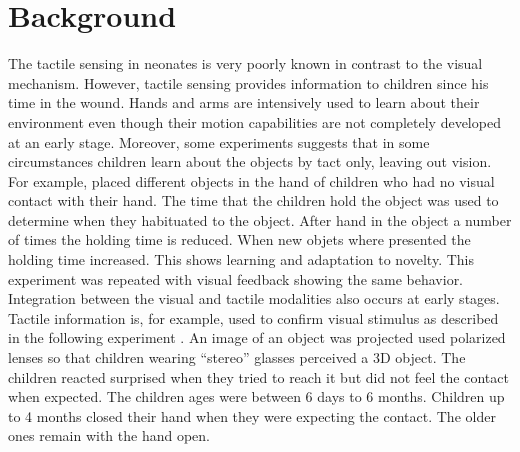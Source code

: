 \section{Background}
\label{sec:background}

The tactile sensing in neonates is very poorly known
 in contrast to the visual mechanism\cite{Streti-voir-atteindre-toucher}.
However, tactile sensing provides information to children since
his time in the wound. Hands and arms are intensively used to
learn about their environment even though their motion
capabilities are not completely developed at an early stage.
Moreover, some experiments suggests that in some circumstances
children learn about the objects by tact only, leaving out vision.
For example, \cite{StretiHabituation} placed different objects in
the hand of children who had no visual contact with their hand.
The time that the children hold the object was used to determine
when they habituated to the object. After hand in the object a
number of times the holding time is reduced. When new objets where
presented the holding time increased. This shows learning and
adaptation to novelty. This experiment was repeated with visual
feedback showing the same behavior.
Integration between the visual and tactile modalities also occurs
at early stages. Tactile information is, for example, used to
confirm visual stimulus as described in the following experiment
\cite{tactileconfirmation}. An image of an object was projected
used polarized lenses so that children wearing ``stereo'' glasses
perceived a 3D object. The children reacted surprised when they
tried to reach it but did not feel the contact when expected. The
children ages were between 6 days to 6 months. Children up to 4
months closed their hand when they were expecting the contact. The
older ones remain with the hand open.

